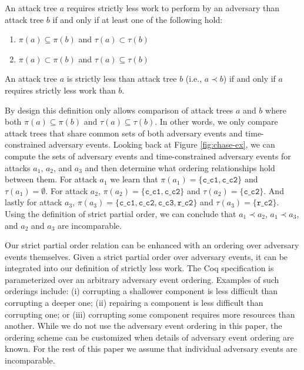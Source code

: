 \documentclass[runningheads]{llncs}
\theoremstyle{definition}
\newcommand{\squash}{\itemsep=0pt\parskip=0pt}
\begin{document}
\begin{definition}
  An attack tree $a$ requires strictly less work to perform by an
  adversary than attack tree $b$ if and only if at least one of the
  following hold:  
\begin{enumerate}
  \squash
  \item $\pi(a) \subseteq \pi(b)$ and $\tau(a) \subset \tau(b)$
  \item $\pi(a) \subset \pi(b)$ and $\tau(a) \subseteq \tau(b)$
\end{enumerate}
\end{definition}

\begin{definition}
  An attack tree $a$ is strictly less than attack tree $b$ (i.e., $a
  \prec b$) if and only if $a$ requires strictly less work than $b$. 
\end{definition}

\noindent By design this definition only allows comparison of
attack trees $a$ and $b$ where both $\pi(a) \subseteq \pi(b)$ and
$\tau(a) \subseteq \tau(b)$. In other words, we only compare attack
trees that share common sets of both adversary events and
time-constrained adversary events. Looking back at Figure
\ref{fig:chase-ex}, we can compute the sets of adversary events and
time-constrained adversary events for attacks $a_1$, $a_2$,
and $a_3$ and then determine what ordering relationships hold between
them. For attack $a_1$ we learn that $\pi(a_1) = \{ \texttt{c\_c1},
\texttt{c\_c2} \}$ and $\tau(a_1) = \emptyset$. For attack $a_2$,
$\pi(a_2) = \{ \texttt{c\_c1}, \texttt{c\_c2} \}$ and $\tau(a_2) = \{
\texttt{c\_c2} \}$. And lastly for attack $a_3$, $\pi(a_3) = \{
\texttt{c\_c1}, \texttt{c\_c2}, \texttt{c\_c3}, \texttt{r\_c2} \}$ and
$\tau(a_3) = \{ \texttt{r\_c2} \}$. Using the definition of strict
partial order, we can conclude that $a_1 \prec a_2$, $a_1 \prec
a_3$, and $a_2$ and $a_3$ are incomparable. 

Our strict partial order relation can be enhanced
with an ordering over adversary events themselves. Given a strict
partial order over adversary events, it can be integrated into our
definition of strictly less work. The Coq specification is
parameterized over an arbitrary adversary event ordering. Examples of
such orderings include: (i) corrupting a shallower
component is less difficult than corrupting a deeper one; (ii)
repairing a component is less difficult than corrupting one; or (iii)
corrupting some component requires more resources than another.  While we do not
use the adversary event ordering in this paper, the ordering scheme
can be customized when details of adversary event ordering are
known. For the rest of this paper we assume that individual adversary events 
are incomparable.
\end{document}
